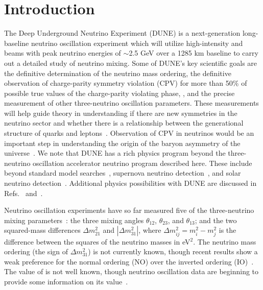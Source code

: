 \section{Introduction}
\label{sec:intro}

The Deep Underground Neutrino Experiment (DUNE) is a next-generation long-baseline neutrino oscillation experiment which will utilize high-intensity \numu and \anumu beams with peak neutrino energies of $\sim$2.5 GeV over a 1285 km baseline to carry out a detailed study of neutrino mixing. Some of DUNE's key scientific goals are the definitive determination of the neutrino mass ordering, the definitive observation of charge-parity symmetry violation (CPV) for more than 50\% of possible true values of the charge-parity violating phase, \deltacp, and the precise measurement of other three-neutrino oscillation parameters.
These measurements will help guide theory in understanding if there are new symmetries in the neutrino sector and whether there is a relationship between the generational structure of quarks and leptons~\cite{Qian:2015waa}. Observation of CPV in neutrinos would be an important step in understanding the origin of the baryon asymmetry of the universe~\cite{Fukugita:1986hr, Davidson:2008bu}. We note that DUNE has a rich physics program beyond the three-neutrino oscillation accelerator neutrino program described here. These include beyond standard model searches~\cite{Abi:2020kei}, supernova neutrino detection~\cite{Abi:2020lpk}, and solar neutrino detection~\cite{Capozzi:2018dat}. Additional physics possibilities with DUNE are discussed in Refs.~\cite{Abi:2020evt} and~\cite{AbedAbud:2021hpb}.

Neutrino oscillation experiments have so far measured five of the three-neutrino mixing parameters~\cite{Capozzi:2017ipn,deSalas:2020pgw,Esteban:2020cvm}: the three mixing angles $\theta_{12}$, $\theta_{23}$, and $\theta_{13}$; and the two squared-mass differences $\Delta m^{2}_{21}$ and $|\Delta m^{2}_{31}|$, where $\Delta m^2_{ij} = m^2_{i} - m^{2}_{j}$ is the difference between the squares of the neutrino masses in eV$^{2}$.
The neutrino mass ordering (the sign of $\Delta m^{2}_{31}$) is not currently known, though recent results show a weak preference for the normal ordering (NO) over the inverted ordering (IO)~\cite{Abe:2021gky,PhysRevD.97.072001,PhysRevLett.123.151803}.
The value of \deltacp is not well known, though neutrino oscillation data are beginning to provide some information on its value~\cite{Abe:2019vii,Abe:2021gky}.

